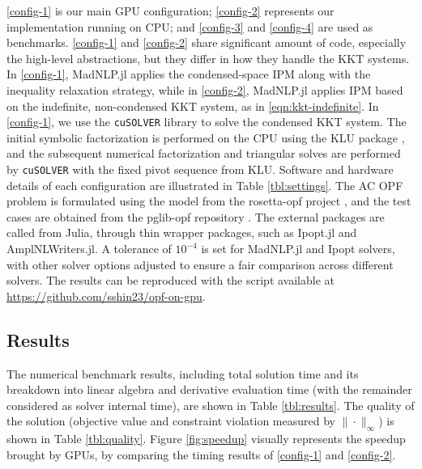 \ref{config-1} is our main GPU configuration; \ref{config-2}
represents our implementation running on CPU; and \ref{config-3} and
\ref{config-4} are used as benchmarks. \ref{config-1} and
\ref{config-2} share significant amount of code, especially the
high-level abstractions, but they differ in how they handle the KKT
systems. In \ref{config-1}, MadNLP.jl applies the condensed-space IPM
along with the inequality relaxation strategy, while in
\ref{config-2}, MadNLP.jl applies IPM based on the indefinite,
non-condensed KKT system, as in \eqref{eqn:kkt-indefinite}. In
\ref{config-1}, we use the {\tt cuSOLVER} library to solve the condensed KKT
system. The initial symbolic factorization is performed on the CPU using the KLU
package \cite{davis2010algorithm}, and the subsequent numerical
factorization and triangular solves are performed by {\tt cuSOLVER} with the
fixed pivot sequence from KLU.  Software and hardware details of each
configuration are illustrated in Table \ref{tbl:settings}. The AC OPF
problem is formulated using the model from the rosetta-opf project
\cite{rosetta-opf}, and the test cases are obtained from the pglib-opf
repository \cite{babaeinejadsarookolaee2019power}. The external
packages are called from Julia, through thin wrapper
packages, such as Ipopt.jl and AmplNLWriters.jl. A tolerance of
$10^{-4}$ is set for MadNLP.jl and Ipopt solvers, with other solver
options adjusted to ensure a fair comparison across different
solvers. The results can be reproduced with the script available at
\url{https://github.com/sshin23/opf-on-gpu}.

\subsection{Results}

The numerical benchmark results, including total solution time and its
breakdown into linear algebra and derivative evaluation time (with the
remainder considered as solver internal time), are shown in Table
\ref{tbl:results}. The quality of the solution (objective value and
constraint violation measured by $\|\cdot\|_\infty$) is shown in Table
\ref{tbl:quality}. Figure \ref{fig:speedup} visually represents the
speedup brought by GPUs, by comparing the timing results of
\ref{config-1} and \ref{config-2}.



